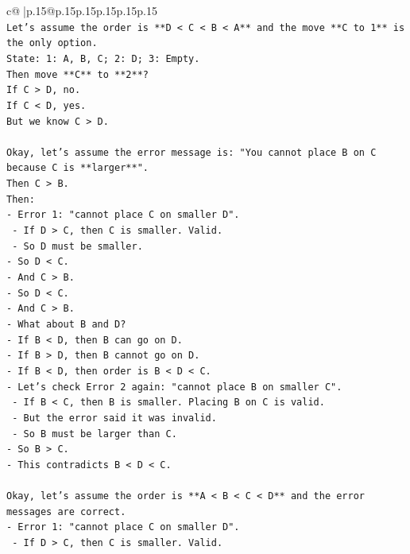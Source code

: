 \documentclass{article}
\begin{document}
{\begin{supertabular}{c@{$\;$}|p{.15\linewidth}@{}p{.15\linewidth}p{.15\linewidth}p{.15\linewidth}p{.15\linewidth}p{.15\linewidth}}
{{{\\ 
\texttt{Let's assume the order is **D < C < B < A** and the move **C to 1** is the only option.} \\
\texttt{State: 1: A, B, C; 2: D; 3: Empty.} \\
\texttt{Then move **C** to **2**?} \\
\texttt{If C > D, no.} \\
\texttt{If C < D, yes.} \\
\texttt{But we know C > D.} \\
\\ 
\texttt{Okay, let's assume the error message is: "You cannot place B on C because C is **larger**".} \\
\texttt{Then C > B.} \\
\texttt{Then:} \\
\texttt{{-} Error 1: "cannot place C on smaller D".} \\
\texttt{    {-} If D > C, then C is smaller. Valid.} \\
\texttt{    {-} So D must be smaller.} \\
\texttt{{-} So D < C.} \\
\texttt{{-} And C > B.} \\
\texttt{{-} So D < C.} \\
\texttt{{-} And C > B.} \\
\texttt{{-} What about B and D?} \\
\texttt{{-} If B < D, then B can go on D.} \\
\texttt{{-} If B > D, then B cannot go on D.} \\
\texttt{{-} If B < D, then order is B < D < C.} \\
\texttt{{-} Let's check Error 2 again: "cannot place B on smaller C".} \\
\texttt{    {-} If B < C, then B is smaller. Placing B on C is valid.} \\
\texttt{    {-} But the error said it was invalid.} \\
\texttt{    {-} So B must be larger than C.} \\
\texttt{{-} So B > C.} \\
\texttt{{-} This contradicts B < D < C.} \\
\\ 
\texttt{Okay, let's assume the order is **A < B < C < D** and the error messages are correct.} \\
\texttt{{-} Error 1: "cannot place C on smaller D".} \\
\texttt{    {-} If D > C, then C is smaller. Valid.} \\
}}}
\end{supertabular}}
\end{document}
